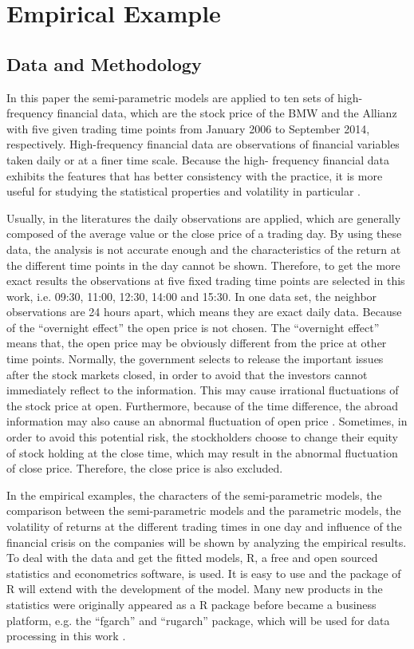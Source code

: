 \chapter{Empirical Example}


\section{Data and Methodology}

In this paper the semi-parametric models are applied to ten sets of high-frequency financial data, which are the stock price of the BMW and the Allianz with five given trading time points from January 2006 to September 2014, respectively. High-frequency financial data are observations of financial variables taken daily or at a finer time scale. Because the high- frequency financial data exhibits the features that has better consistency with the practice, it is more useful for studying the statistical properties and volatility in particular \citep{Zivot2005}.

Usually, in the literatures the daily observations are applied, which are generally composed of the average value or the close price of a trading day. By using these data, the analysis is not accurate enough and the characteristics of the return at the different time points in the day cannot be shown. Therefore, to get the more exact results the observations at five fixed trading time points are selected in this work, i.e. 09:30, 11:00, 12:30, 14:00 and 15:30. In one data set, the neighbor observations are 24 hours apart, which means they are exact daily data. Because of the ``overnight effect'' the open price is not chosen. The ``overnight effect'' means that, the open price may be obviously different from the price at other time points. Normally, the government selects to release the important issues after the stock markets closed, in order to avoid that the investors cannot immediately reflect to the information. This may cause irrational fluctuations of the stock price at open. Furthermore, because of the time difference, the abroad information may also cause an abnormal fluctuation of open price \citep{Tsai2012}. Sometimes, in order to avoid this potential risk, the stockholders choose to change their equity of stock holding at the close time, which may result in the abnormal fluctuation of close price. Therefore, the close price is also excluded. 

In the empirical examples, the characters of the semi-parametric models, the comparison between the semi-parametric models and the parametric models, the volatility of returns at the different trading times in one day and influence of the financial crisis on the companies will be shown by analyzing the empirical results. To deal with the data and get the fitted models, R, a free and open sourced statistics and econometrics software, is used. It is easy to use and the package of R will extend with the development of the model. Many new products in the statistics were originally appeared as a R package before became a business platform, e.g. the ``fgarch'' and ``rugarch'' package, which will be used for data processing in this work \citep{Consulting2013}.

